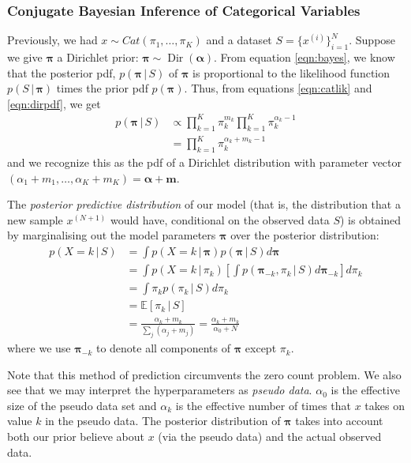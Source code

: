 \documentclass[final,3p,times,twocolumn]{elsarticle}
\DeclareMathOperator*{\Dir}{Dir}
\let\bs\boldsymbol
\begin{document}
\subsubsection*{\normalfont \small \bfseries Conjugate Bayesian Inference of Categorical Variables}
Previously, we had $x \sim Cat(\pi_1,\dots,\pi_K)$ and a dataset $S = \{x^{(i)}\}_{i=1}^N$. Suppose we give $\bs \pi$ a Dirichlet prior: $\bs \pi \sim \Dir(\bs \alpha)$. 
From equation \ref{eqn:bayes}, we know that the posterior pdf, $p(\bs \pi \,|\, S)$ of $\bs \pi$ is proportional to the likelihood function $p(S\,|\,\bs \pi)$ times the prior pdf $p(\bs \pi)$.
Thus, from equations \ref{eqn:catlik} and \ref{eqn:dirpdf}, we get
\begin{equation}
\label{eqn:dirpost}
\begin{split}
p(\bs \pi \,|\, S) &\propto \prod\nolimits_{k=1}^K\pi_k^{m_k} \prod\nolimits_{k=1}^K \pi_k^{\alpha_k - 1}\\
	&= \prod\nolimits_{k=1}^K \pi_k^{\alpha_k+m_k-1}
\end{split}
\end{equation}
and we recognize this as the pdf of a Dirichlet distribution with parameter vector $(\alpha_1+m_1,\dots,\alpha_K+m_K) = \bs \alpha + \bs m$.

The \emph{posterior predictive distribution} of our model (that is, the distribution that a new sample $x^{(N+1)}$ would have, conditional on the observed data $S$) is obtained by marginalising out the model parameters $\bs \pi$ over the posterior distribution:
\begin{equation}
\begin{split}
p(X = k\,|\,S) &= \int p(X = k\,|\,\bs \pi)p(\bs \pi \,|\,S)d\bs\pi\\
&= \int p(X = k\,|\,\pi_k)\left[\int p(\bs \pi_{-k},\pi_k\,|\,S)d\bs\pi_{-k}\right]d\pi_k\\
&= \int \pi_k p(\pi_k\,|\,S)d\pi_k\\
&= \mathbb{E}\left[\pi_k\,|\,S\right]\\
&= \frac{\alpha_k + m_k}{\sum_j (\alpha_j+m_j)} = \frac{\alpha_k+m_k}{\alpha_0 + N}
\end{split}
\end{equation}
where we use $\bs \pi_{-k}$ to denote all components of $\bs \pi$ except $\pi_k$.

Note that this method of prediction circumvents the zero count problem.
We also see that we may interpret the hyperparameters as \emph{pseudo data}.
$\alpha_0$ is the effective size of the pseudo data set and $\alpha_k$ is the effective number of times that $x$ takes on value $k$ in the pseudo data.
The posterior distribution of $\bs \pi$ takes into account both our prior believe about $x$ (via the pseudo data) and the actual observed data.
\end{document}
